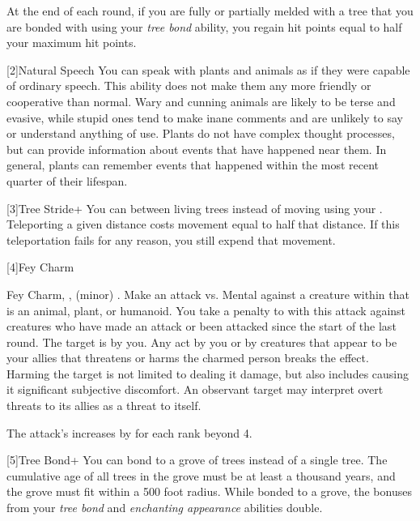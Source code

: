         At the end of each round, if you are fully or partially melded with a tree that you are bonded with using your \textit{tree bond} ability, you regain hit points equal to half your maximum hit points.

        [2]{Natural Speech} You can speak with plants and animals as if they were capable of ordinary speech.
            This ability does not make them any more friendly or cooperative than normal.
            Wary and cunning animals are likely to be terse and evasive, while stupid ones tend to make inane comments and are unlikely to say or understand anything of use.
            Plants do not have complex thought processes, but can provide information about events that have happened near them.
            In general, plants can remember events that happened within the most recent quarter of their lifespan.

        [3]{Tree Stride+} You can  between living trees instead of moving using your .
        Teleporting a given distance costs movement equal to half that distance.
        If this teleportation fails for any reason, you still expend that movement.

        [4]{Fey Charm}
        \begin{magicalsustainability}{Fey Charm}{, ,  (minor)}
            \abilityusagetime {}.
            \rankline
            Make an attack vs. Mental against a creature within \medrange that is an animal, plant, or humanoid.
            You take a  penalty to  with this attack against creatures who have made an attack or been attacked since the start of the last round.
            \hit The target is \charmed by you.
            Any act by you or by creatures that appear to be your allies that threatens or harms the charmed person breaks the effect.
            Harming the target is not limited to dealing it damage, but also includes causing it significant subjective discomfort.
            An observant target may interpret overt threats to its allies as a threat to itself.

            \rankline

            \noindent The attack's  increases by  for each rank beyond 4.
        \end{magicalsustainability}

        [5]{Tree Bond+} You can bond to a grove of trees instead of a single tree.
        The cumulative age of all trees in the grove must be at least a thousand years, and the grove must fit within a 500 foot radius.
        While bonded to a grove, the bonuses from your \textit{tree bond} and \textit{enchanting appearance} abilities double.

